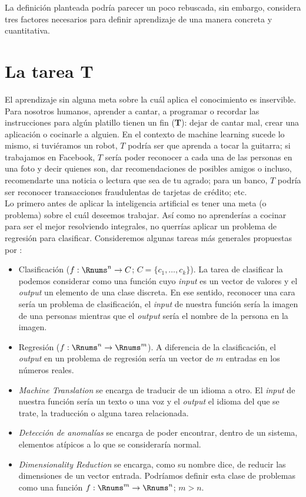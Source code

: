 \documentclass[11pt]{article}
\begin{document}
La definición planteada podría parecer un poco rebuscada, sin embargo, considera tres factores necesarios para definir aprendizaje de una manera concreta y cuantitativa.

\section{La tarea \textbf{T}}
El aprendizaje sin alguna meta sobre la cuál aplica el conocimiento es inservible. Para nosotros humanos, aprender a cantar, a programar o recordar las instrucciones para algún platillo tienen un fin (\textbf{T}): dejar de cantar mal, crear una aplicación o cocinarle a alguien. En el contexto de machine learning sucede lo mismo, si tuviéramos un robot, $T$ podría ser que aprenda a tocar la guitarra; si trabajamos en Facebook, $T$ sería poder reconocer a cada una de las personas en una foto y decir quienes son, dar recomendaciones de posibles amigos o incluso, recomendarte una noticia o lectura que sea de tu agrado; para un banco, $T$ podría ser reconocer transacciones fraudulentas de tarjetas de crédito; etc.\\

Lo primero antes de aplicar la inteligencia artificial es tener una meta (o problema) sobre el cuál deseemos trabajar. Así como no aprenderías a cocinar para ser el mejor resolviendo integrales, no querrías aplicar un problema de regresión para clasificar. Consideremos algunas tareas más generales propuestas por \cite{Goodfellow-et-al-2016} :
\begin{itemize}
	\item Clasificación ($f: \Rnums^n \to C$; $C = \{c_1, \ldots, c_k\}$). La tarea de clasificar la podemos considerar como una función cuyo \textit{input} es un vector de valores y el \textit{output} un elemento de una clase discreta. En ese sentido, reconocer una cara sería un problema de clasificación, el \textit{input} de nuestra función sería la imagen de una personas mientras que el \textit{output} sería el nombre de la persona en la imagen.
	\item Regresión ($f: \Rnums^n \to \Rnums^m$). A diferencia de la clasificación, el \textit{output} en un problema de regresión sería un vector de $m$ entradas en los números reales.
	\item \textit{Machine Translation} se encarga de traducir de un idioma a otro. El \textit{input} de nuestra función sería un texto o una voz y el \textit{output} el idioma del que se trate, la traducción o alguna tarea relacionada.
	\item \textit{Detección de anomalías} se encarga de poder encontrar, dentro de un sistema, elementos atípicos a lo que se consideraría normal.
	\item \textit{Dimensionality Reduction} se encarga, como su nombre dice, de reducir las dimensiones de un vector entrada. Podríamos definir esta clase de problemas como una función $f: \Rnums^m \to \Rnums^n$; $m > n$. 
\end{itemize}
\end{document}
